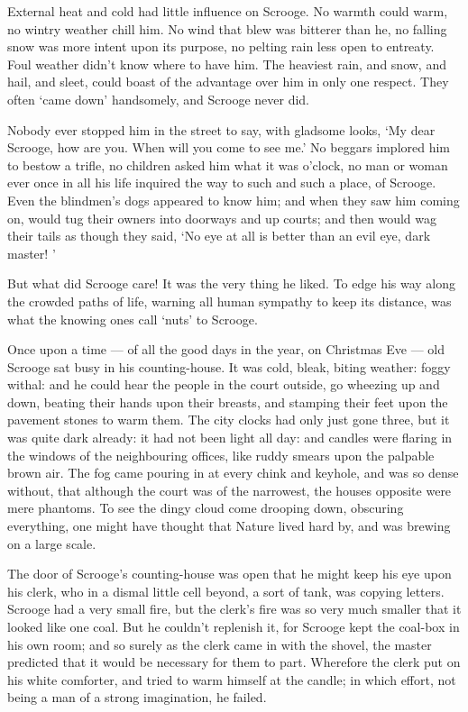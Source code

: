\documentclass[11pt,twoside]{article}\makeatletter
\begin{document}
External heat and cold had little influence on Scrooge. No warmth could warm, no wintry weather chill him.  No wind that blew was bitterer than he, no falling snow was more intent upon its purpose, no pelting rain less open to entreaty. Foul weather didn't know where to have him.  The heaviest rain, and snow, and hail, and sleet, could boast of the advantage over him in only one respect.  They often ‘came down’ handsomely, and Scrooge never did.  \par
Nobody ever stopped him in the street to say, with gladsome looks, ‘My dear Scrooge, how are you.  When will you come to see me.’  No beggars implored him to bestow a trifle, no children asked him what it was o'clock, no man or woman ever once in all his life inquired the way to such and such a place, of Scrooge.  Even the blindmen's dogs appeared to know him; and when they saw him coming on, would tug their owners into doorways  and up courts; and then would wag their tails as though they said, ‘No eye at all is better than an evil eye, dark master! ’  \par
But what did Scrooge care!  It was the very thing he liked.  To edge his way along the crowded paths of life, warning all human sympathy to keep its distance, was what the knowing ones call ‘nuts’ to Scrooge.  \par
Once upon a time — of all the good days in the year, on Christmas Eve — old Scrooge sat busy in his counting-house. It was cold, bleak, biting weather: foggy withal: and he could hear the people in the court outside, go wheezing up and down, beating their hands upon their breasts, and stamping their feet upon the pavement stones to warm them. The city clocks had only just gone three, but it was quite dark already: it had not been light all day: and candles were flaring in the windows of the neighbouring offices, like ruddy smears upon the palpable brown air.  The fog came pouring in at every chink and keyhole, and was so dense without, that although the court was of the   narrowest, the houses opposite were mere phantoms.  To see the dingy cloud come drooping down, obscuring everything, one might have thought that Nature lived hard by, and was brewing on a large scale.  \par
The door of Scrooge's counting-house was open that he might keep his eye upon his clerk, who in a dismal little cell beyond, a sort of tank, was copying letters.  Scrooge had a very small fire, but the clerk's fire was so very much smaller that it looked like one coal.  But he couldn't replenish it, for Scrooge kept the coal-box in his own room; and so surely as the clerk came in with the shovel, the master predicted that it would be necessary for them to part.  Wherefore the clerk put on his white comforter, and tried to warm himself at the candle; in which effort, not being a man of a strong imagination, he failed.  \par
\end{document}
